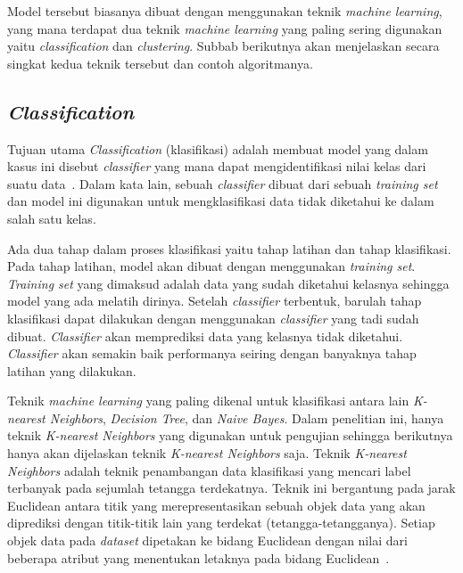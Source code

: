Model tersebut biasanya dibuat dengan menggunakan teknik \textit{machine learning}, yang mana terdapat dua teknik \textit{machine learning} yang paling sering digunakan yaitu \textit{classification} dan \textit{clustering}. Subbab berikutnya akan menjelaskan secara singkat kedua teknik tersebut dan contoh algoritmanya.

\subsection{\textit{Classification}}
\label{subsec:classification}

Tujuan utama \textit{Classification} (klasifikasi) adalah membuat model yang dalam kasus ini disebut \textit{classifier} yang mana dapat mengidentifikasi nilai kelas dari suatu data~\cite{mendes:17:ppdmieee}. Dalam kata lain, sebuah \textit{classifier} dibuat dari sebuah \textit{training set} dan model ini digunakan untuk mengklasifikasi data tidak diketahui ke dalam salah satu kelas.

Ada dua tahap dalam proses klasifikasi yaitu tahap latihan dan tahap klasifikasi. Pada tahap latihan, model akan dibuat dengan menggunakan \textit{training set}. \textit{Training set} yang dimaksud adalah data yang sudah diketahui kelasnya sehingga model yang ada melatih dirinya. Setelah \textit{classifier} terbentuk, barulah tahap klasifikasi dapat dilakukan dengan menggunakan \textit{classifier} yang tadi sudah dibuat. \textit{Classifier} akan memprediksi data yang kelasnya tidak diketahui. \textit{Classifier} akan semakin baik performanya seiring dengan banyaknya tahap latihan yang dilakukan.

Teknik \textit{machine learning} yang paling dikenal untuk klasifikasi antara lain \textit{K-nearest Neighbors}, \textit{Decision Tree}, dan \textit{Naive Bayes}. Dalam penelitian ini, hanya teknik \textit{K-nearest Neighbors} yang digunakan untuk pengujian sehingga berikutnya hanya akan dijelaskan teknik \textit{K-nearest Neighbors} saja. Teknik \textit{K-nearest Neighbors} adalah teknik penambangan data klasifikasi yang mencari label terbanyak pada sejumlah tetangga terdekatnya. Teknik ini bergantung pada jarak Euclidean antara titik yang merepresentasikan sebuah objek data yang akan diprediksi dengan titik-titik lain yang terdekat (tetangga-tetangganya). Setiap objek data pada \textit{dataset} dipetakan ke bidang Euclidean dengan nilai dari beberapa atribut yang menentukan letaknya pada bidang Euclidean~\cite{jiawei:12:datmin}.

